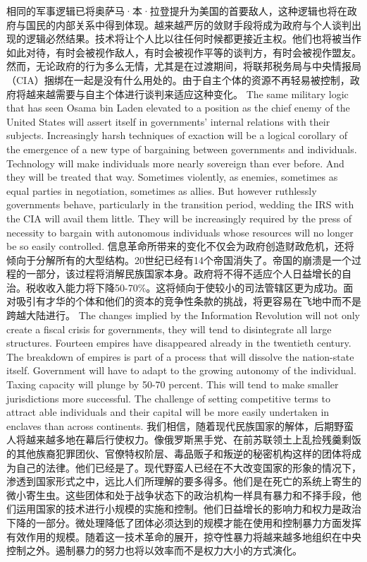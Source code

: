 \begin{paracol}{2}[]
\switchcolumn*
相同的军事逻辑已将奥萨马·本·拉登提升为美国的首要敌人，这种逻辑也将在政府与国民的内部关系中得到体现。越来越严厉的敛财手段将成为政府与个人谈判出现的逻辑必然结果。技术将让个人比以往任何时候都更接近主权。他们也将被当作如此对待，有时会被视作敌人，有时会被视作平等的谈判方，有时会被视作盟友。然而，无论政府的行为多么无情，尤其是在过渡期间，将联邦税务局与中央情报局（CIA）捆绑在一起是没有什么用处的。由于自主个体的资源不再轻易被控制，政府将越来越需要与自主个体进行谈判来适应这种变化。
\switchcolumn
The same military logic that has seen Osama bin Laden elevated to a position as the chief enemy of the United States will assert itself in governments' internal relations with their subjects. Increasingly harsh techniques of exaction will be a logical corollary of the emergence of a new type of bargaining between governments and individuals. Technology will make individuals more nearly sovereign than ever before. And they will be treated that way. Sometimes violently, as enemies, sometimes as equal parties in negotiation, sometimes as allies. But however ruthlessly governments behave, particularly in the transition period, wedding the IRS with the CIA will avail them little. They will be increasingly required by the press of necessity to bargain with autonomous individuals whose resources will no longer be so easily controlled.
\switchcolumn*
信息革命所带来的变化不仅会为政府创造财政危机，还将倾向于分解所有的大型结构。20世纪已经有14个帝国消失了。帝国的崩溃是一个过程的一部分，该过程将消解民族国家本身。政府将不得不适应个人日益增长的自治。税收收入能力将下降50-70\%。这将倾向于使较小的司法管辖区更为成功。面对吸引有才华的个体和他们的资本的竞争性条款的挑战，将更容易在飞地中而不是跨越大陆进行。
\switchcolumn
The changes implied by the Information Revolution will not only create a fiscal crisis for governments, they will tend to disintegrate all large structures. Fourteen empires have disappeared already in the twentieth century. The breakdown of empires is part of a process that will dissolve the nation-state itself. Government will have to adapt to the growing autonomy of the individual. Taxing capacity will plunge by 50-70 percent. This will tend to make smaller jurisdictions more successful. The challenge of setting competitive terms to attract able individuals and their capital will be more easily undertaken in enclaves than across continents.
\switchcolumn*
我们相信，随着现代民族国家的解体，后期野蛮人将越来越多地在幕后行使权力。像俄罗斯黑手党、在前苏联领土上乱捡残羹剩饭的其他族裔犯罪团伙、官僚特权阶层、毒品贩子和叛逆的秘密机构这样的团体将成为自己的法律。他们已经是了。现代野蛮人已经在不大改变国家的形象的情况下，渗透到国家形式之中，远比人们所理解的要多得多。他们是在死亡的系统上寄生的微小寄生虫。这些团体和处于战争状态下的政治机构一样具有暴力和不择手段，他们运用国家的技术进行小规模的实施和控制。他们日益增长的影响力和权力是政治下降的一部分。微处理降低了团体必须达到的规模才能在使用和控制暴力方面发挥有效作用的规模。随着这一技术革命的展开，掠夺性暴力将越来越多地组织在中央控制之外。遏制暴力的努力也将以效率而不是权力大小的方式演化。

\end{paracol}
